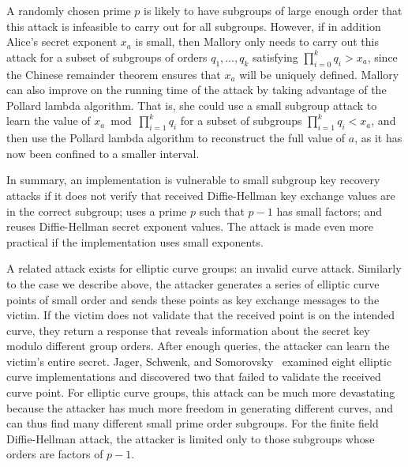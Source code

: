 A randomly chosen prime $p$ is likely to have subgroups of large enough order
that this attack is infeasible to carry out for all subgroups.  However, if in
addition Alice's secret exponent $x_a$ is small, then Mallory only needs to carry out this
attack for a subset of subgroups of orders $q_1, \dots, q_k$ satisfying
$\prod_{i=0}^k q_i > x_a$, since the Chinese remainder theorem ensures that $x_a$
will be uniquely defined.
Mallory can also improve on the running time of the attack by taking advantage
of the Pollard lambda algorithm.  That is, she could use a small subgroup
attack to learn the value of $x_a \bmod \prod_{i=1}^k q_i$ for a subset of
subgroups $\prod_{i=1}^k q_i < x_a$, and then use the Pollard lambda algorithm to
reconstruct the full value of $a$, as it has now been confined to a smaller
interval.

In summary, an implementation is vulnerable to small subgroup key recovery
attacks if it does not verify that received Diffie-Hellman key exchange values
are in the correct subgroup; uses a prime $p$ such that $p-1$ has small
factors; and reuses Diffie-Hellman secret exponent values.  The attack is made
even more practical if the implementation uses small exponents.

A related attack exists for elliptic curve groups: an invalid curve attack.
Similarly to the case we describe above, the attacker generates a series of
elliptic curve points of small order and sends these
points as key exchange messages to the victim.  If the victim does not validate that the received
point is on the intended curve, they return a response that reveals information
about the secret key modulo different group orders.  After enough queries, the
attacker can learn the victim's entire secret.  Jager, Schwenk, and
Somorovsky~\cite{jager-2015} examined eight elliptic curve implementations and
discovered two that failed to validate the received curve point. For elliptic
curve groups, this attack can be much more devastating because the attacker has
much more freedom in generating different curves, and can thus find many
different small prime order subgroups.  For the finite field Diffie-Hellman
attack, the attacker is limited only to those subgroups whose orders are factors
of $p-1$.

